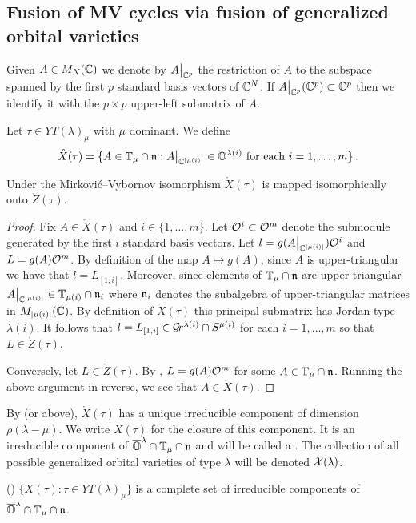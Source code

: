 \documentclass{article}
\begin{document}
\subsection{Fusion of MV cycles via fusion of generalized orbital varieties}

Given $A \in M_N(\mathbb C)$ we denote by $A\big|_{\mathbb C^p}$ the restriction of $A$ to the subspace spanned by the first $p$ standard basis vectors of $\mathbb C^N$.  If $A\big|_{\mathbb C^p}(\mathbb C^p)\subset\mathbb C^p$ then we identify it with the $p\times p$ upper-left submatrix of $A$. 

Let $\tau\in YT(\lambda)_\mu$ with $\mu$ dominant. We define
\[
\mathring X(\tau) = 
    \{
        A \in  \mathbb T_\mu\cap\mathfrak n : A\big|_{\mathbb C^{|\mu(i)|}} \in \mathbb O^{\lambda(i)} \text{ for each } i = 1,\dots,m
    \}\,.
\]

\begin{lemma}
    \label{lem:XtZt}
    Under the Mirkovi\'c--Vybornov isomorphism $\mathring X(\tau)$ is mapped isomorphically onto $\mathring Z(\tau)$. 
\end{lemma}
\begin{proof}
Fix $A\in\mathring X(\tau)$ and $i\in\{1,\dots,m\}$. Let $\mathcal O^i\subset\mathcal O^m$ denote the submodule generated by the first $i$ standard basis vectors. Let $l = g(A\big|_{\mathbb C^{\lvert\mu(i)\rvert}}) \mathcal O^i$ and $L = g(A) \mathcal O^m$. By definition of the map $A \mapsto g(A)$, since $ A $ is upper-triangular we have that $l = L_{[1,i]}$. 
Moreover, since elements of $\mathbb T_\mu\cap\mathfrak n$ are upper triangular $A\big|_{\mathbb C^{\lvert\mu(i)\rvert}}\in\mathbb T_{\mu(i)}\cap\mathfrak n_i$ where $\mathfrak n_i$ denotes the subalgebra of upper-triangular matrices in $M_{\lvert\mu(i)\rvert}(\mathbb C)$. 
By definition of $\mathring X(\tau)$ this principal submatrix has Jordan type $\lambda(i)$. It follows that $l = L_{[1,i]} \in \mathcal{G}\!r^{\lambda(i)} \cap S^{\mu(i)}$ for each $i=1,\dots,m$ so that $L\in\mathring Z(\tau)$. 

Conversely, let $ L \in \mathring Z(\tau) $.  By , $ L = g(A)\mathcal O^m$ for some $ A \in \mathbb T_\mu \cap \mathfrak n $.  Running the above argument in reverse, we see that $ A \in \mathring X(\tau)$. 
\end{proof}

By \cite[Prop.\ 4.5.4]{dthesis} (or  above), $ \mathring X(\tau) $ has a unique irreducible component of dimension $ \rho(\lambda - \mu)$.  We write $ X(\tau)$ for the closure of this component.  It is an irreducible component of $ \overline{\mathbb O}^\lambda \cap \mathbb T_\mu \cap \mathfrak n$ and will be called a . 
% 
The collection of all possible generalized orbital varieties of type $\lambda$ will be denoted $\mathcal{X}(\lambda)$. 
% 
\begin{theorem}(\cite[Theorem~4.8.2]{dthesis})
\label{pr:generalized orbital varietiesasirrecs}
    $\{X(\tau) : \tau \in YT(\lambda)_\mu \}$
    is a complete set of irreducible components of $\overline{\mathbb O}^\lambda\cap\mathbb T_\mu\cap\mathfrak n$. 
\end{theorem}
\end{document}
